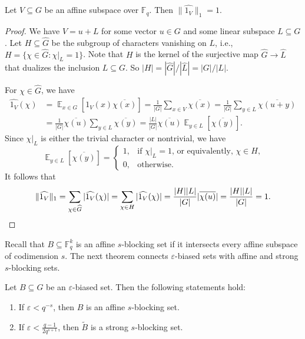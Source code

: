 \documentclass[11pt]{article}
\newcommand{\eps}{\varepsilon}
\newcommand{\ex}{\mathop{{}\mathbb{E}}}
\newcommand{\F}{\mathbb{F}}
\begin{document}
\begin{lemma}\label{lem:l1bound}
    Let $V\subseteq G$ be an affine subspace over $\F_q$. Then $\|\widehat{1_V}\|_1=1$.
\end{lemma}

\begin{proof}
We have $V=u+L$ for some vector $u\in G$ and some linear subspace $L\subseteq G$.
Let $H\subseteq \widehat{G}$ be the subgroup of characters vanishing on $L$, i.e., $H=\{\chi\in\widehat{G}: \chi|_L=1\}$. Note that $H$ is the kernel of the surjective map $\widehat{G}\to \widehat{L}$ that dualizes the inclusion $L\subseteq G$. So $|H|=|\widehat{G}|/|\widehat{L}|=|G|/|L|$.

For $\chi\in \widehat{G}$, we have
\begin{align*}
\widehat{1_V}(\chi)
&=\ex_{x\in G}\left[1_V(x)\overline{\chi(x)}\right] 
=\frac{1}{|G|}\sum_{x\in V}
\overline{\chi(x)}
=\frac{1}{|G|}\sum_{y\in L}
\overline{\chi(u+y)}\\
&=\frac{1}{|G|}\overline{\chi(u)}\sum_{y\in L}
\overline{\chi(y)}
=\frac{|L|}{|G|}\overline{\chi(u)}\ex_{y\in L}
\left[\overline{\chi(y)}\right].
\end{align*}
Since $\chi|_L$ is either the trivial character or nontrivial, we have
\[
\ex_{y\in L}
\left[\overline{\chi(y)}\right]=\begin{cases}
1, & \text{if $\chi|_L=1$, or equivalently, $\chi\in H$,}\\
0, & \text{otherwise}.
\end{cases}
\]
It follows that 
\[
\|\widehat{1_V}\|_1
=\sum_{\chi\in \widehat{G}} |\widehat{1_V}(\chi)|
=\sum_{\chi\in H} |\widehat{1_V}(\chi)|
=\frac{|H| |L|}{|G|}|\overline{\chi(u)}|
=\frac{|H| |L|}{|G|}=1. \qedhere
\]
\end{proof}

Recall that $B \subseteq \F_q^k$ is an affine $s$-blocking set if it intersects every affine subspace of codimension $s$.
The next theorem connects $\eps$-biased sets with affine and strong $s$-blocking sets.

\begin{theorem}\label{thm:biased-to-blocking} 
    Let $B\subseteq G$ be an $\eps$-biased set. Then the following statements hold:
    \begin{enumerate}
        \item\label{item:biased-1} If $\eps<q^{-s}$, then $B$ is an affine $s$-blocking set.
        \item\label{item:biased-2} If $\eps<\frac{q-1}{2q^{s+1}}$, then $\widetilde{B}$ is a strong $s$-blocking set.
    \end{enumerate}
\end{theorem}
\end{document}
